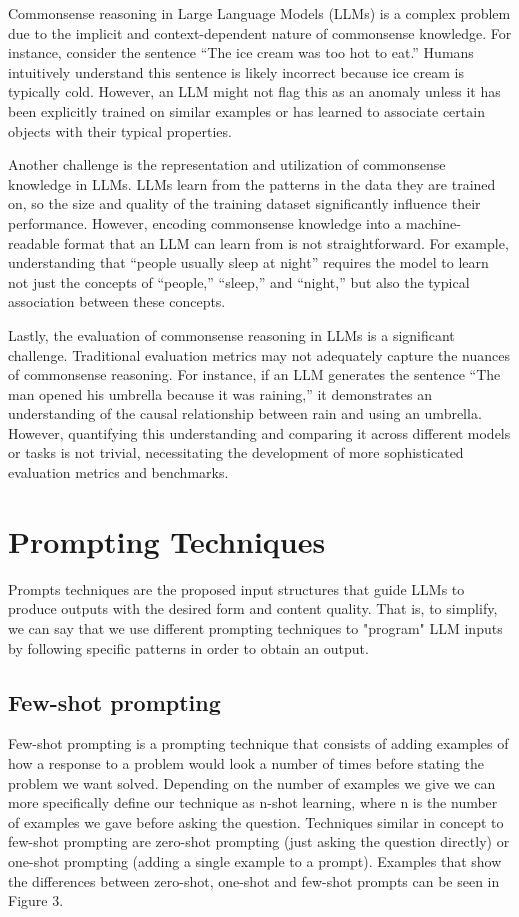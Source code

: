 \documentclass[fleqn,moreauthors,10pt]{ds_report}
\begin{document}
Commonsense reasoning in Large Language Models (LLMs) is a complex problem due to the implicit and context-dependent nature of commonsense knowledge. For instance, consider the sentence “The ice cream was too hot to eat.” Humans intuitively understand this sentence is likely incorrect because ice cream is typically cold. However, an LLM might not flag this as an anomaly unless it has been explicitly trained on similar examples or has learned to associate certain objects with their typical properties.

Another challenge is the representation and utilization of commonsense knowledge in LLMs. LLMs learn from the patterns in the data they are trained on, so the size and quality of the training dataset significantly influence their performance. However, encoding commonsense knowledge into a machine-readable format that an LLM can learn from is not straightforward. For example, understanding that “people usually sleep at night” requires the model to learn not just the concepts of “people,” “sleep,” and “night,” but also the typical association between these concepts.

Lastly, the evaluation of commonsense reasoning in LLMs is a significant challenge. Traditional evaluation metrics may not adequately capture the nuances of commonsense reasoning. For instance, if an LLM generates the sentence “The man opened his umbrella because it was raining,” it demonstrates an understanding of the causal relationship between rain and using an umbrella. However, quantifying this understanding and comparing it across different models or tasks is not trivial, necessitating the development of more sophisticated evaluation metrics and benchmarks.

\section*{Prompting Techniques}

Prompts techniques are the proposed input structures that guide LLMs to produce outputs with the desired form and content quality. That is, to simplify, we can say that we use different prompting techniques to "program" LLM inputs by following specific patterns in order to obtain an output. \cite{prompttechniques}

\subsection*{Few-shot prompting}
Few-shot prompting \cite{Few-shot} is a prompting technique that consists of adding examples of how a response to a problem would look a number of times before stating the problem we want solved. Depending on the number of examples we give we can more specifically define our technique as n-shot learning, where n is the number of examples we gave before asking the question. Techniques similar in concept to few-shot prompting are zero-shot prompting (just asking the question directly) or one-shot prompting (adding a single example to a prompt). 
Examples that show the differences between zero-shot, one-shot and few-shot prompts can be seen in Figure 3.
\end{document}
